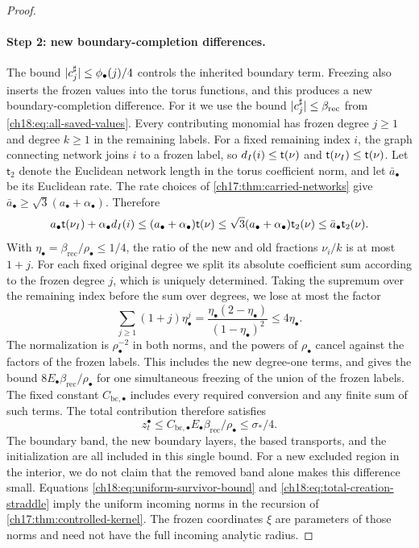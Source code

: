 \begin{proof}
\paragraph{Step 2: new boundary-completion differences.}
The bound $\lvert c_j^\sharp\rvert\le\phi_\bullet(j)/4$ controls the inherited boundary term. Freezing also inserts the frozen values into the torus functions, and this produces a new boundary-completion difference. For it we use the bound $\lvert c_j^\sharp\rvert\le\beta_{\mathrm{rec}}$ from \eqref{ch18:eq:all-saved-values}. Every contributing monomial has frozen degree $j\ge1$ and degree $k\ge1$ in the remaining labels. For a fixed remaining index $i$, the graph connecting network joins $i$ to a frozen label, so $d_I(i)\le\mathsf t(\nu)$ and $\mathsf t(\nu_I)\le\mathsf t(\nu)$. Let $\mathsf t_2$ denote the Euclidean network length in the torus coefficient norm, and let $\bar a_\bullet$ be its Euclidean rate. The rate choices of \cref{ch17:thm:carried-networks} give $\bar a_\bullet\ge\sqrt3(a_\bullet+\alpha_\bullet)$. Therefore
\[
 a_\bullet\mathsf t(\nu_I)+\alpha_\bullet d_I(i)
 \le(a_\bullet+\alpha_\bullet)\mathsf t(\nu)
 \le\sqrt3(a_\bullet+\alpha_\bullet)\mathsf t_2(\nu)
 \le\bar a_\bullet\mathsf t_2(\nu).
\]
With $\eta_\bullet=\beta_{\mathrm{rec}}/\rho_\bullet\le1/4$, the ratio of the new and old fractions $\nu_i/k$ is at most $1+j$. For each fixed original degree we split its absolute coefficient sum according to the frozen degree $j$, which is uniquely determined. Taking the supremum over the remaining index before the sum over degrees, we lose at most the factor
\[
 \sum_{j\ge1}(1+j)\eta_\bullet^j
  =\frac{\eta_\bullet(2-\eta_\bullet)}
              {(1-\eta_\bullet)^2}\le4\eta_\bullet.
\]
The normalization is $\rho_\bullet^{-2}$ in both norms, and the powers of $\rho_\bullet$ cancel against the factors of the frozen labels. This includes the new degree-one terms, and gives the bound $8E_\bullet\beta_{\mathrm{rec}}/\rho_\bullet$ for one simultaneous freezing of the union of the frozen labels. The fixed constant $C_{\mathrm{bc},\bullet}$ includes every required conversion and any finite sum of such terms. The total contribution therefore satisfies
\begin{equation}\label{ch18:eq:total-creation-straddle}
 z_t^\bullet\le
 C_{\mathrm{bc},\bullet}E_\bullet
            \beta_{\mathrm{rec}}/\rho_\bullet\le\sigma_*/4.
\end{equation}
The boundary band, the new boundary layers, the based transports, and the initialization are all included in this single bound. For a new excluded region in the interior, we do not claim that the removed band alone makes this difference small. Equations \eqref{ch18:eq:uniform-survivor-bound} and \eqref{ch18:eq:total-creation-straddle} imply the uniform incoming norms in the recursion of \cref{ch17:thm:controlled-kernel}. The frozen coordinates $\xi$ are parameters of those norms and need not have the full incoming analytic radius.


\end{proof}
